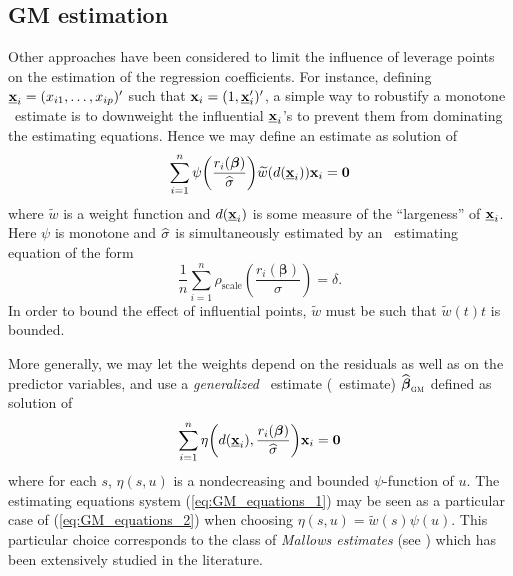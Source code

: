 \subsection{GM estimation}

Other approaches have been considered to limit the influence of leverage points
on the estimation of the regression coefficients. For instance, defining
$\underline{\mathbf x}_i = (x_{i1}, \ldots, x_{ip})'$ such that
$\mathbf x_i = (1,\underline{\mathbf x}_i')'$, a simple way to robustify a
monotone ~estimate is to downweight the influential
$\underline{\mathbf x}_i$'s to prevent them from dominating the estimating
equations. Hence we may define an estimate as solution of
\begin{equation}\label{eq:GM_equations_1}
    \sum_{i=1}^{n} \psi\left(\frac{r_i(\boldsymbol\beta)}{\sthat{\sigma}}\right) 
    \widetilde{w}(d(\underline{\stvec{x}}_i)) \stvec{x}_i = \stvec{0}
\end{equation}
where $\widetilde{w}$ is a weight function and $d(\underline{\mathbf x}_i)$
is some measure of the “largeness” of $\underline{\mathbf x}_i$. Here $\psi$
is monotone and $\widehat{\sigma}$ is simultaneously estimated by an 
~estimating equation of the form
\[
    \frac{1}{n}\sum_{i=1}^{n} \rho_{\mathrm{scale}}\left(\frac{r_i(\boldsymbol\beta)}{\sigma}\right)  = \delta.
\]
In order to bound the effect of influential points, $\widetilde{w}$ must be
such that $\widetilde{w}(t)t$ is bounded.

More generally, we may let the weights depend on the residuals as well as on
the predictor variables, and use a \emph{generalized} ~estimate
(~estimate) $\sthat{\boldsymbol\beta}_{\stsc{GM}}$ defined as solution
of
%
\begin{equation}\label{eq:GM_equations_2}
    \sum_{i=1}^{n}\eta\left(d(\underline{\stvec{x}}_i), \frac{r_i(\boldsymbol\beta)}{\sthat{\sigma}}\right)
    \stvec{x}_i = \stvec{0}
\end{equation}
%
where for each $s$, $\eta(s,u)$ is a nondecreasing and bounded $\psi$-function
of $u$. The estimating equations system (\ref{eq:GM_equations_1}) may be seen
as a particular case of (\ref{eq:GM_equations_2}) when choosing $\eta(s,u) =
\widetilde{w}(s) \psi(u)$. This particular choice corresponds to the class of
\emph{Mallows estimates} (see \citealp{Mallows:1975}) which has been
extensively studied in the literature.

